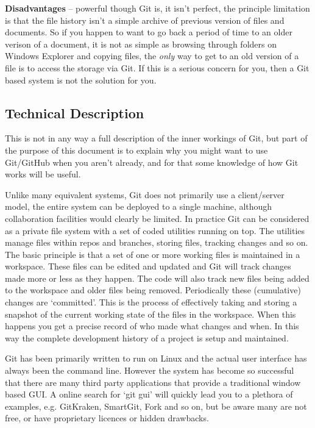 \documentclass[a4paper, 12pt]{article}
\begin{document}
\textbf{Disadvantages} -- powerful though Git is, it isn't perfect, the principle limitation is that the file history isn't a simple archive of previous version of files and documents. So if you happen to want to go back a period of time to an older verison of a document, it is not as simple as browsing through folders on Windows Explorer and copying files, the \textit{only} way to get to an old version of a file is to access the storage via Git. If this is a serious concern for you, then a Git based system is not the solution for you.

\subsection{Technical Description}
This is not in any way a full description of the inner workings of Git, but part of the purpose of this document is to explain why you might want to use Git/GitHub when you aren't already, and for that some knowledge of how Git works will be useful.

Unlike many equivalent systems, Git does not primarily use a client/server model, the entire system can be deployed to a single machine, although collaboration facilities would clearly be limited. In practice Git can be considered as a private file system with a set of coded utilities running on top. The utilities manage files within repos and branches, storing files, tracking changes and so on. The basic principle is that a set of one or more working files is maintained in a workspace. These files can be edited and updated and Git will track changes made more or less as they happen. The code will also track new files being added to the workspace and older files being removed. Periodically these (cumulative) changes are `committed'. This is the process of effectively taking and storing a snapshot of the current working state of the files in the workspace. When this happens you get a precise record of who made what changes and when. In this way the complete development history of a project is setup and maintained. 

Git has been primarily written to run on Linux and the actual user interface has always been the command line. However the system has become so successful that there are many third party applications that provide a traditional window based GUI. A online search for `git gui' will quickly lead you to a plethora of examples, e.g. GitKraken, SmartGit, Fork and so on, but be aware many are not free, or have proprietary licences or hidden drawbacks.
\end{document}
